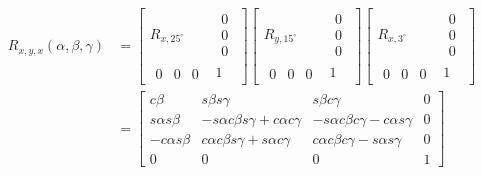 \documentclass[12pt, a4paper]{article}
\begin{document}
\begin{align}
	R_{x, y, x}(\alpha, \beta, \gamma) & =         \begin{bmatrix}
		                                               R_{x, 25^\circ}                       & \begin{matrix} 0 \\ 0 \\ 0 \end{matrix} \\
		                                               \begin{matrix} 0 & 0 & 0 \end{matrix} & 1
	                                               \end{bmatrix}
	\begin{bmatrix}
		R_{y, 15^\circ}                       & \begin{matrix} 0 \\ 0 \\ 0 \end{matrix} \\
		\begin{matrix} 0 & 0 & 0 \end{matrix} & 1
	\end{bmatrix}
	\begin{bmatrix}
		R_{x, 3^\circ}                        & \begin{matrix} 0 \\ 0 \\ 0 \end{matrix} \\
		\begin{matrix} 0 & 0 & 0 \end{matrix} & 1
	\end{bmatrix}             \nonumber                                                                                 \\
	                                   & = \begin{bmatrix}
		                                       c\beta          & s\beta s\gamma                            & s\beta c\gamma                            & 0 \\
		                                       s\alpha s\beta  & -s\alpha c\beta s\gamma + c\alpha c\gamma & -s\alpha c\beta c\gamma - c\alpha s\gamma & 0 \\
		                                       -c\alpha s\beta & c\alpha c\beta s\gamma + s\alpha c\gamma  & c\alpha c\beta c\gamma - s\alpha s\gamma  & 0 \\
		                                       0               & 0                                         & 0                                         & 1\end{bmatrix}
\end{align}
\end{document}
